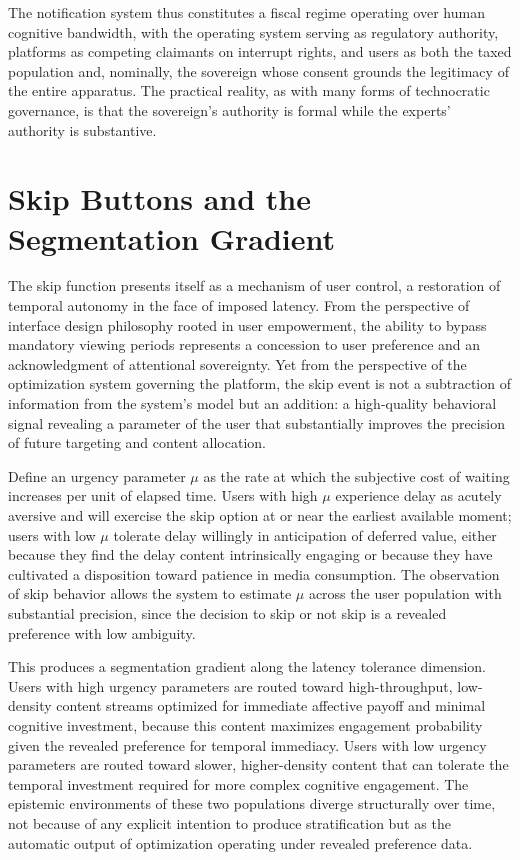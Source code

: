 \documentclass[12pt]{article}
\begin{document}
The notification system thus constitutes a fiscal regime operating over human cognitive bandwidth, with the operating system serving as regulatory authority, platforms as competing claimants on interrupt rights, and users as both the taxed population and, nominally, the sovereign whose consent grounds the legitimacy of the entire apparatus. The practical reality, as with many forms of technocratic governance, is that the sovereign's authority is formal while the experts' authority is substantive.

\section{Skip Buttons and the Segmentation Gradient}

The skip function presents itself as a mechanism of user control, a restoration of temporal autonomy in the face of imposed latency. From the perspective of interface design philosophy rooted in user empowerment, the ability to bypass mandatory viewing periods represents a concession to user preference and an acknowledgment of attentional sovereignty. Yet from the perspective of the optimization system governing the platform, the skip event is not a subtraction of information from the system's model but an addition: a high-quality behavioral signal revealing a parameter of the user that substantially improves the precision of future targeting and content allocation.

Define an urgency parameter $\mu$ as the rate at which the subjective cost of waiting increases per unit of elapsed time. Users with high $\mu$ experience delay as acutely aversive and will exercise the skip option at or near the earliest available moment; users with low $\mu$ tolerate delay willingly in anticipation of deferred value, either because they find the delay content intrinsically engaging or because they have cultivated a disposition toward patience in media consumption. The observation of skip behavior allows the system to estimate $\mu$ across the user population with substantial precision, since the decision to skip or not skip is a revealed preference with low ambiguity.

This produces a segmentation gradient along the latency tolerance dimension. Users with high urgency parameters are routed toward high-throughput, low-density content streams optimized for immediate affective payoff and minimal cognitive investment, because this content maximizes engagement probability given the revealed preference for temporal immediacy. Users with low urgency parameters are routed toward slower, higher-density content that can tolerate the temporal investment required for more complex cognitive engagement. The epistemic environments of these two populations diverge structurally over time, not because of any explicit intention to produce stratification but as the automatic output of optimization operating under revealed preference data.
\end{document}

